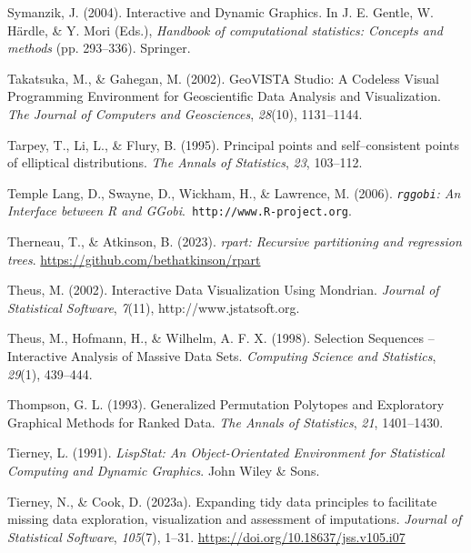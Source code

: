 \documentclass[
  letterpaper,
]{krantz}
\newlength{\cslhangindent}
\newenvironment{CSLReferences}[2] %
 {\begin{list}{}{%
  \setlength{\itemindent}{0pt}
  \setlength{\leftmargin}{0pt}
  \setlength{\parsep}{0pt}
  \ifodd #1
   \setlength{\leftmargin}{\cslhangindent}
   \setlength{\itemindent}{-1\cslhangindent}
  \fi
  \setlength{\itemsep}{#2\baselineskip}}}
 {\end{list}}
\begin{document}
\begin{CSLReferences}{1}{0}
Symanzik, J. (2004). Interactive and {D}ynamic {G}raphics. In J. E.
Gentle, W. Härdle, \& Y. Mori (Eds.), \emph{Handbook of computational
statistics: Concepts and methods} (pp. 293--336). Springer.

Takatsuka, M., \& Gahegan, M. (2002). {GeoVISTA Studio}: A {C}odeless
{V}isual {P}rogramming {E}nvironment for {G}eoscientific {D}ata
{A}nalysis and {V}isualization. \emph{The Journal of Computers and
Geosciences}, \emph{28}(10), 1131--1144.

Tarpey, T., Li, L., \& Flury, B. (1995). Principal points and
self--consistent points of elliptical distributions. \emph{The Annals of
Statistics}, \emph{23}, 103--112.

Temple Lang, D., Swayne, D., Wickham, H., \& Lawrence, M. (2006).
\emph{{\texttt{rggobi}}: {A}n {I}nterface between {R} and
{GG}obi}.{\texttt{\ http://www.R-project.org}}.

Therneau, T., \& Atkinson, B. (2023). \emph{{rpart}: Recursive
partitioning and regression trees}.
\url{https://github.com/bethatkinson/rpart}

Theus, M. (2002). Interactive {D}ata {V}isualization {U}sing {M}ondrian.
\emph{Journal of Statistical Software}, \emph{7}(11),
http://www.jstatsoft.org.

Theus, M., Hofmann, H., \& Wilhelm, A. F. X. (1998). Selection
{S}equences -- {I}nteractive {A}nalysis of {M}assive {D}ata {S}ets.
\emph{Computing Science and Statistics}, \emph{29}(1), 439--444.

Thompson, G. L. (1993). Generalized {P}ermutation {P}olytopes and
{E}xploratory {G}raphical {M}ethods for {R}anked {D}ata. \emph{The
Annals of Statistics}, \emph{21}, 1401--1430.

Tierney, L. (1991). \emph{{L}isp{S}tat: {A}n {O}bject-{O}rientated
{E}nvironment for {S}tatistical {C}omputing and {D}ynamic {G}raphics}.
John Wiley \& Sons.

Tierney, N., \& Cook, D. (2023a). Expanding tidy data principles to
facilitate missing data exploration, visualization and assessment of
imputations. \emph{Journal of Statistical Software}, \emph{105}(7),
1--31. \url{https://doi.org/10.18637/jss.v105.i07}


\end{CSLReferences}
\end{document}
